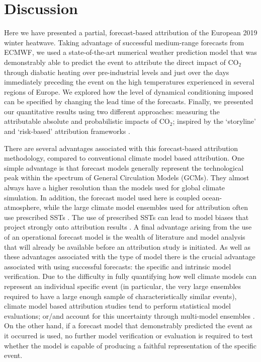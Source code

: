 \section{Discussion}\label{ch3:discussion}

  Here we have presented a partial, forecast-based attribution of the European 2019 winter heatwave. Taking advantage of successful medium-range forecasts from ECMWF, we used a state-of-the-art numerical weather prediction model that was demonstrably able to predict the event to attribute the direct impact of CO$_2$ through diabatic heating over pre-industrial levels and just over the days immediately preceding the event on the high temperatures experienced in several regions of Europe. We explored how the level of dynamical conditioning imposed can be specified by changing the lead time of the forecasts. Finally, we presented our quantitative results using two different approaches: measuring the attributable absolute and probabilistic impacts of CO$_2$; inspired by the `storyline' and `risk-based' attribution frameworks \citep{stott_human_2004,shepherd_common_2016,winsberg_severe_2020,jezequel_behind_2018}.  
  
  There are several advantages associated with this forecast-based attribution methodology, compared to conventional climate model based attribution. One simple advantage is that forecast models generally represent the technological peak within the spectrum of General Circulation Models (GCMs). They almost always have a higher resolution than the models used for global climate simulation. In addition, the forecast model used here is coupled ocean-atmosphere, while the large climate model ensembles used for attribution often use prescribed SSTs \citep{ciavarella_upgrade_2018}. The use of prescribed SSTs can lead to model biases that project strongly onto attribution results \citep{fischer_biased_2018}. A final advantage arising from the use of an operational forecast model is the wealth of literature and model analysis that will already be available before an attribution study is initiated. As well as these advantages associated with the type of model there is the crucial advantage associated with using successful forecasts: the specific and intrinsic model verification. Due to the difficulty in fully quantifying how well climate models can represent an individual specific event (in particular, the very large ensembles required to have a large enough sample of characteristically similar events), climate model based attribution studies tend to perform statistical model evaluations; or/and account for this uncertainty through multi-model ensembles \citep{philip_protocol_2020}. On the other hand, if a forecast model that demonstrably predicted the event as it occurred is used, no further model verification or evaluation is required to test whether the model is capable of producing a faithful representation of the specific event.
  
